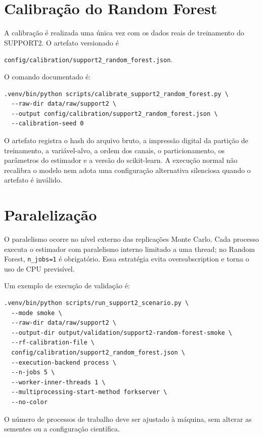 \section{Calibração do Random Forest}

A calibração é realizada uma única vez com os dados reais de treinamento do SUPPORT2. O artefato versionado é
\begin{center}
\texttt{config/calibration/support2\_random\_forest.json}.
\end{center}

O comando documentado é:

\begin{verbatim}
.venv/bin/python scripts/calibrate_support2_random_forest.py \
  --raw-dir data/raw/support2 \
  --output config/calibration/support2_random_forest.json \
  --calibration-seed 0
\end{verbatim}

O artefato registra o hash do arquivo bruto, a impressão digital da partição de treinamento, a variável-alvo, a ordem dos canais, o particionamento, os parâmetros do estimador e a versão do scikit-learn. A execução normal não recalibra o modelo nem adota uma configuração alternativa silenciosa quando o artefato é inválido.

\section{Paralelização}

O paralelismo ocorre no nível externo das replicações Monte Carlo. Cada processo executa o estimador com paralelismo interno limitado a uma thread; no Random Forest, \texttt{n\_jobs=1} é obrigatório. Essa estratégia evita oversubscription e torna o uso de CPU previsível.

Um exemplo de execução de validação é:

\begin{verbatim}
.venv/bin/python scripts/run_support2_scenario.py \
  --mode smoke \
  --raw-dir data/raw/support2 \
  --output-dir output/validation/support2-random-forest-smoke \
  --rf-calibration-file \
  config/calibration/support2_random_forest.json \
  --execution-backend process \
  --n-jobs 5 \
  --worker-inner-threads 1 \
  --multiprocessing-start-method forkserver \
  --no-color
\end{verbatim}

O número de processos de trabalho deve ser ajustado à máquina, sem alterar as sementes ou a configuração científica.

